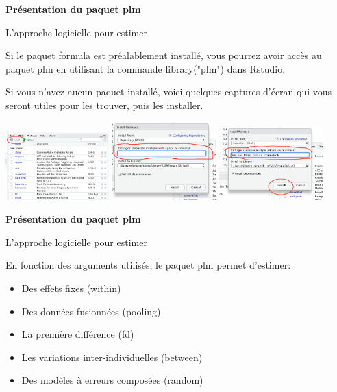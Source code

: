 \documentclass{beamer}
\begin{document}
\begin{frame}{\textbf{Pr\'esentation du paquet plm}}
\begin{block}{L'approche logicielle pour estimer}
\end{block}
Si le paquet formula est pr\'ealablement install\'e, vous pourrez avoir acc\`es au paquet plm en utilisant  la commande library("plm") dans Rstudio. \newline

Si vous n'avez aucun paquet install\'e, voici quelques captures d'\'ecran qui vous seront utiles pour les trouver, puis les installer. 
\begin{multicols}{3}
\includegraphics [width=4cm] {TrouverPackage.png} 
\includegraphics [width=4cm] {LUI.png} 
\includegraphics [width=4cm] {LUI2.png} 
\end{multicols}
\end{frame}
\begin{frame}{\textbf{Pr\'esentation du paquet plm}}
\begin{block}{L'approche logicielle pour estimer}
\end{block}
En fonction des arguments utilis\'es, le paquet plm permet d'estimer:
\begin{itemize}
\item Des effets fixes (within)
\item Des donn\'ees fusionn\'ees (pooling)
\item La premi\`ere diff\'erence (fd)
\item Les variations inter-individuelles (between)
\item Des mod\`eles \`a erreurs compos\'ees (random)
\end{itemize}
\end{frame}
\end{document}
